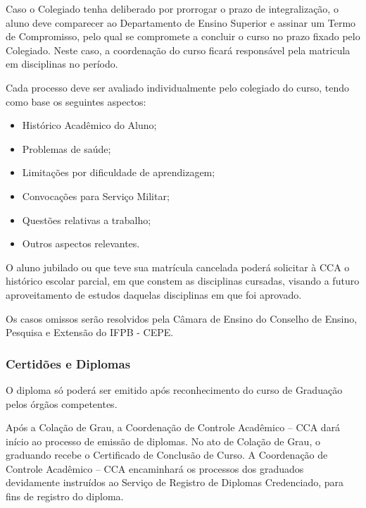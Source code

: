 		Caso o Colegiado tenha deliberado por prorrogar o prazo de integralização, o aluno deve comparecer ao Departamento de Ensino Superior e assinar um Termo de Compromisso, pelo qual se compromete a concluir o curso no prazo fixado pelo Colegiado. Neste caso, a coordenação do curso ficará responsável pela matricula em disciplinas no período.

		Cada processo deve ser avaliado individualmente pelo colegiado do curso, tendo como base os seguintes aspectos:

		\begin{itemize}
			\item Histórico Acadêmico do Aluno;

			\item Problemas de saúde;

			\item Limitações por dificuldade de aprendizagem;

			\item Convocações para Serviço Militar;

			\item Questões relativas a trabalho;

			\item Outros aspectos relevantes.
		\end{itemize}

		O aluno jubilado ou que teve sua matrícula cancelada poderá solicitar à CCA o histórico escolar parcial, em que constem as disciplinas cursadas, visando a futuro aproveitamento de estudos daquelas disciplinas em que foi aprovado. 
		
		Os casos omissos serão resolvidos pela Câmara de Ensino do Conselho de Ensino, Pesquisa e Extensão do IFPB - CEPE.

\subsubsection{Certidões e Diplomas}

	O diploma só poderá ser emitido após reconhecimento do curso de Graduação pelos órgãos competentes.

	Após a Colação de Grau, a Coordenação de Controle Acadêmico – CCA dará início ao processo de emissão de diplomas. No ato de Colação de Grau, o graduando recebe o Certificado de Conclusão de Curso. A Coordenação de Controle Acadêmico – CCA encaminhará os processos dos graduados devidamente instruídos ao Serviço de Registro de Diplomas Credenciado, para fins de registro do diploma.


